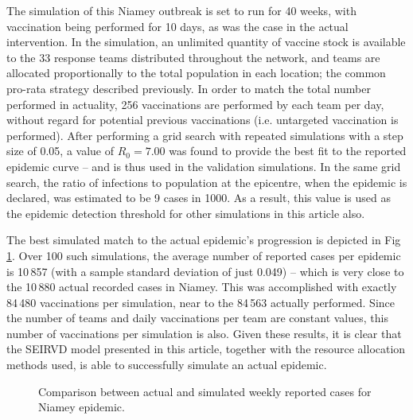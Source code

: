 \documentclass[10pt,letterpaper]{article}
\begin{document}
The simulation of this Niamey outbreak is set to run for 40 weeks, with vaccination being performed for 10 days, as was the case in the actual intervention. In the simulation, an unlimited quantity of vaccine stock is available to the 33 response teams distributed throughout the network, and teams are allocated proportionally to the total population in each location; the common pro-rata strategy described previously. In order to match the total number performed in actuality, 256 vaccinations are performed by each team per day, without regard for potential previous vaccinations (i.e. untargeted vaccination is performed). After performing a grid search with repeated simulations with a step size of 0.05, a value of $R_{0} = 7.00$ was found to provide the best fit to the reported epidemic curve -- and is thus used in the validation simulations. In the same grid search, the ratio of infections to population at the epicentre, when the epidemic is declared, was estimated to be 9 cases in 1000. As a result, this value is used as the epidemic detection threshold for other simulations in this article also.

The best simulated match to the actual epidemic's progression is depicted in Fig \ref{fig:validation_histograms}. Over 100 such simulations, the average number of reported cases per epidemic is 10\,857 (with a sample standard deviation of just 0.049) -- which is very close to the 10\,880 actual recorded cases in Niamey. This was accomplished with exactly 84\,480 vaccinations per simulation, near to the 84\,563 actually performed. Since the number of teams and daily vaccinations per team are constant values, this number of vaccinations per simulation is also. 
Given these results, it is clear that the SEIRVD model presented in this article, together with the resource allocation methods used, is able to successfully simulate an actual epidemic.

\begin{figure}[ht!]
    \caption{Comparison between actual and simulated weekly reported cases for Niamey epidemic.}
    \label{fig:validation_histograms}
\end{figure}
\end{document}

